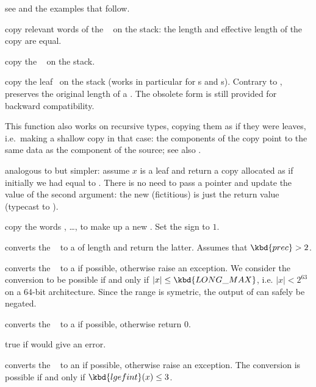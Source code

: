  see  and the examples that
follow.


 copy relevant words of the ~ on the
stack: the length and effective length of the copy are equal.

 copy the ~ on the stack.

 copy the leaf~ on the
stack (works in particular for s and s).
Contrary to ,  preserves the original
length of a . The obsolete form 
is still provided for backward compatibility.

This function also works on recursive types, copying them as if they were
leaves, i.e.~making a shallow copy in that case: the components of the copy
point to the same data as the component of the source; see also
.

 analogous to 
but simpler: assume $x$ is a leaf and return a copy allocated as if
initially we had  equal to . There is no need to pass a
pointer and update the value of the second argument: the new (fictitious)
 is just the return value (typecast to ).

 copy the  words
, \dots,  to make up a new . Set the sign
to $1$.


 converts the ~ to a
 of length  and return the latter.
Assumes that $\kbd{prec} > 2$.

 converts the ~ to a  if
possible, otherwise raise an exception. We consider the conversion
to be possible if and only if $|x| \leq \kbd{LONG\_MAX}$, i.e. $|x| < 2^{63}$
on a 64-bit architecture. Since the range is symetric, the output of
 can safely be negated.

 converts the ~ to a  if
possible, otherwise return $0$.

 true if  would give an error.

 converts the ~ to an  if
possible, otherwise raise an exception. The conversion is possible if
and only if $\kbd{lgefint}(x) \leq 3$.

